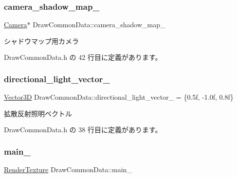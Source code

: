 \subsubsection{\texorpdfstring{camera\+\_\+shadow\+\_\+map\+\_\+}{camera\_shadow\_map\_}}
{\footnotesize\ttfamily \mbox{\hyperlink{class_camera}{Camera}}$\ast$ Draw\+Common\+Data\+::camera\+\_\+shadow\+\_\+map\+\_\+\hspace{0.3cm}{\ttfamily [private]}}



シャドウマップ用カメラ 



 Draw\+Common\+Data.\+h の 42 行目に定義があります。

\mbox{\label{class_draw_common_data_ad08d5a1d1a3de33977a1b4a2d7776343}} 
\subsubsection{\texorpdfstring{directional\+\_\+light\+\_\+vector\+\_\+}{directional\_light\_vector\_}}
{\footnotesize\ttfamily \mbox{\hyperlink{class_vector3_d}{Vector3D}} Draw\+Common\+Data\+::directional\+\_\+light\+\_\+vector\+\_\+ = \{0.\+5f, -\/1.\+0f, 0.\+8f\}\hspace{0.3cm}{\ttfamily [private]}}



拡散反射照明ベクトル 



 Draw\+Common\+Data.\+h の 38 行目に定義があります。

\mbox{\label{class_draw_common_data_a8fb17a79685424132ee5da7093de352d}} 
\subsubsection{\texorpdfstring{main\+\_\+}{main\_}}
{\footnotesize\ttfamily \mbox{\hyperlink{class_render_texture}{Render\+Texture}} Draw\+Common\+Data\+::main\+\_\+\hspace{0.3cm}{\ttfamily [private]}}



